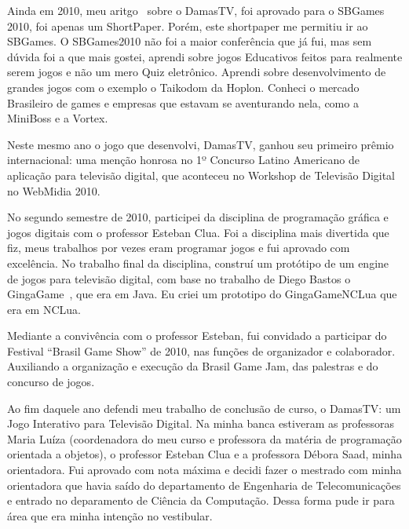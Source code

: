 \documentclass[10pt,a4paper,oneside]{book}
\begin{document}
Ainda em 2010, meu aritgo~\cite{saad2010damastv} sobre o DamasTV, foi aprovado para o SBGames 2010, foi 
apenas um ShortPaper. Porém, este shortpaper me permitiu ir ao SBGames. O SBGames2010 não foi a 
maior conferência que já fui, mas sem dúvida foi a que mais gostei, aprendi sobre jogos Educativos 
feitos para realmente serem jogos e não um mero Quiz eletrônico. Aprendi sobre desenvolvimento de 
grandes jogos com o exemplo o Taikodom da Hoplon. Conheci o mercado Brasileiro de games e empresas 
que estavam se aventurando nela, como a MiniBoss e a Vortex.

Neste mesmo ano o jogo que desenvolvi, DamasTV, ganhou seu primeiro prêmio internacional: uma menção 
honrosa no 1º Concurso Latino Americano de aplicação para televisão digital, que aconteceu no Workshop 
de Televisão Digital no WebMidia 2010.

No segundo semestre de 2010, participei da disciplina de programação gráfica e jogos digitais com o 
professor Esteban Clua. Foi a disciplina mais divertida que fiz, meus trabalhos por vezes eram 
programar jogos e fui aprovado com excelência. No trabalho final da disciplina, construí um 
protótipo de um engine de jogos para televisão digital, com base no trabalho de Diego Bastos o 
GingaGame~\cite{barboza2009ginga}, que era em Java. Eu criei um prototipo do GingaGameNCLua 
que era em NCLua.

Mediante a convivência com o professor Esteban, fui convidado a participar do Festival 
“Brasil Game Show” de 2010, nas funções de organizador e colaborador. Auxiliando a 
organização e execução da Brasil Game Jam, das palestras e do concurso de jogos. 

Ao fim daquele ano defendi meu trabalho de conclusão de curso, o DamasTV: um Jogo Interativo para 
Televisão Digital. Na minha banca estiveram as professoras Maria Luíza (coordenadora do meu curso 
e professora da matéria de programação orientada a objetos), o professor Esteban Clua e a 
professora Débora Saad, minha orientadora. Fui aprovado com nota máxima e decidi fazer o 
mestrado com minha orientadora que havia saído do departamento de Engenharia de Telecomunicações 
e entrado no deparamento de Ciência da Computação. Dessa forma pude ir para área que era minha intenção
no vestibular.
\end{document}
